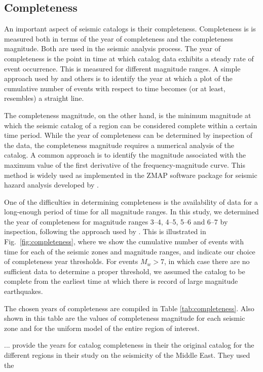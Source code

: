 
\subsection{Completeness}

An important aspect of seismic catalogs is their completeness.  Completeness is is measured both in terms of the year of completeness and the completeness magnitude. Both are used in the seismic analysis process. The year of completeness is the point in time at which catalog data exhibits a steady rate of event occurrence. This is measured for different magnitude ranges. A simple approach used by \citet{Frankel1995} and others is to identify the year at which a plot of the cumulative number of events with respect to time becomes (or at least, resembles) a straight line. 

The completeness magnitude, on the other hand, is the minimum magnitude at which the seismic catalog of a region can be considered complete within a certain time period. While the year of completeness can be determined by inspection of the data, the completeness magnitude requires a numerical analysis of the catalog. A common approach is to identify the magnitude associated with the maximum value of the first derivative of the frequency-magnitude curve. This method is widely used as implemented in the ZMAP software package for seismic hazard analysis developed by \citet{Wiemer2001}.

One of the difficulties in determining completeness is the availability of data for a long-enough period of time for all magnitude ranges. In this study, we determined the year of completeness for magnitude ranges 3--4, 4--5, 5--6 and 6--7 by inspection, following the approach used by \citet{Frankel1995}. This is illustrated in Fig.~\ref{fig:completeness}, where we show the cumulative number of events with time for each of the seismic zones and magnitude ranges, and indicate our choice of completeness year thresholds. For events $M_w>7$, in which case there are no sufficient data to determine a proper threshold, we assumed the catalog to be complete from the earliest time at which there is record of large magnitude earthquakes. 

The chosen years of completeness are compiled in Table \ref{tab:completeness}. Also shown in this table are the values of completeness magnitude for each seismic zone and for the uniform model of the entire region of interest. 


... \citet{Zare} provide the years for catalog completeness in their the original catalog for the different regions in their study on the seismicity of the Middle East. They used the 





